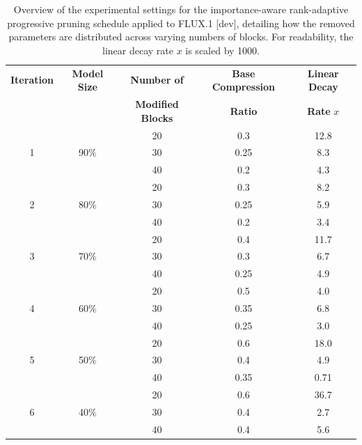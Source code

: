 \begin{table}[H]
	\centering
	\caption[Parameter Removal Distribution: Compression Details]{Overview of the experimental settings for the importance-aware rank-adaptive progressive pruning schedule applied to FLUX.1 [dev], detailing how the removed parameters are distributed across varying numbers of blocks. For readability, the linear decay rate $x$ is scaled by 1000.}
	\label{tab:compression_iterations}
	\begin{tabular}{ccccc}
		\toprule
		\textbf{Iteration} &\textbf{Model Size} & \textbf{Number of} & \textbf{Base Compression} & \textbf{Linear Decay}\\
		&&\textbf{Modified Blocks}&\textbf{Ratio}& \textbf{Rate} $x$\\
		\midrule
		\multirow{3}{*}{1} 
		& \multirow{3}{*}{90\%}  
		& 20 & 0.3 & 12.8 \\
		&  &   30 & 0.25 & 8.3 \\
		&  & 40  & 0.2 & 4.3 \\
		\midrule
		\multirow{3}{*}{2} 
		& \multirow{3}{*}{80\%} 
		& 20 & 0.3 & 8.2 \\
		&  &   30 & 0.25 & 5.9 \\
		&  & 40  & 0.2 & 3.4  \\
		\midrule
		\multirow{3}{*}{3} 
		& \multirow{3}{*}{70\%}  
		& 20 & 0.4 & 11.7  \\
		&  &   30 & 0.3  & 6.7 \\
		&  & 40  & 0.25 & 4.9  \\
		\midrule
		\multirow{3}{*}{4} 
		& \multirow{3}{*}{60\%}  & 20 & 0.5 & 4.0  \\
		&  &   30 & 0.35  & 6.8 \\
		&  & 40  & 0.25 & 3.0 \\
		\midrule
		\multirow{3}{*}{5} 
		& \multirow{3}{*}{50\%}  & 20 & 0.6 & 18.0  \\
		&  &   30 & 0.4 & 4.9 \\
		&  & 40  & 0.35 & 0.71  \\
		
		\midrule
		\multirow{3}{*}{6} 
		& \multirow{3}{*}{40\%}  
		& 20 & 0.6 &  36.7 \\
		&  &   30 & 0.4 & 2.7 \\
		&  & 40  & 0.4& 5.6  \\
		
		\bottomrule
	\end{tabular}
\end{table}



